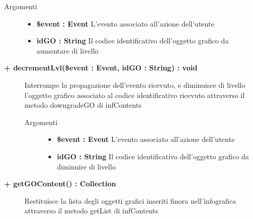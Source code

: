 \begin{description}
\begin{description}
		\begin{description}
			\item[Argomenti] \hfill
				\begin{itemize}
				
					\item \textbf{\$event : Event		} \hfill
					L'evento associato all'azione dell'utente
					\item \textbf{idGO : String		} \hfill
					Il codice identificativo dell'oggetto grafico da aumentare di livello
					
				\end{itemize}
			
		\end{description}
	\end{description}
	
	\begin{description}
		\item[\textbf{\color{blue} + decrementLvl(\$event : Event, idGO : String) : void		}] \hfill
			Interrompe la propagazione dell'evento ricevuto, e diminuisce di livello l'oggetto grafico associato al codice identificativo ricevuto attraverso il metodo downgradeGO di infContents
			
		\begin{description}
			\item[Argomenti] \hfill
				\begin{itemize}
				
					\item \textbf{\$event : Event		} \hfill
					L'evento associato all'azione dell'utente
					\item \textbf{idGO : String		} \hfill
					Il codice identificativo dell'oggetto grafico da diminuire di livello
					
				\end{itemize}
			
		\end{description}
	\end{description}
	
	\begin{description}
		\item[\textbf{\color{blue}+ getGOContent() : Collection		}] \hfill
			Restituisce la lista degli oggetti grafici inseriti finora nell'infografica attraverso il metodo getList di infContents
			

\end{description}
\end{description}
